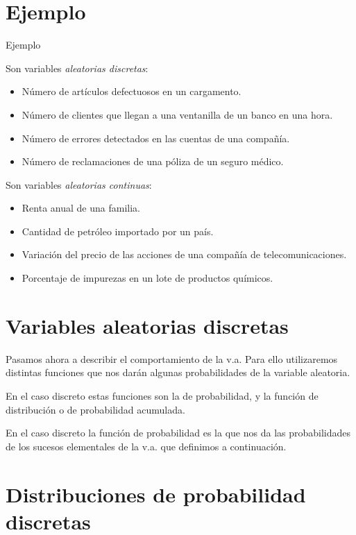 \documentclass[
  letterpaper,
  DIV=11,
  numbers=noendperiod]{scrreprt}
\providecommand{\tightlist}{%
  \setlength{\itemsep}{0pt}\setlength{\parskip}{0pt}}\usepackage{longtable,booktabs,array}
\begin{document}
\section{Ejemplo}\label{ejemplo}

\begin{Ejemplo}{Ejemplo}{}

Son variables \emph{aleatorias discretas}:

\begin{itemize}
\tightlist
\item
  Número de artículos defectuosos en un cargamento.
\item
  Número de clientes que llegan a una ventanilla de un banco en una
  hora.
\item
  Número de errores detectados en las cuentas de una compañía.
\item
  Número de reclamaciones de una póliza de un seguro médico.
\end{itemize}

Son variables \emph{aleatorias continuas}:

\begin{itemize}
\tightlist
\item
  Renta anual de una familia.
\item
  Cantidad de petróleo importado por un país.
\item
  Variación del precio de las acciones de una compañía de
  telecomunicaciones.
\item
  Porcentaje de impurezas en un lote de productos químicos.
\end{itemize}

\end{Ejemplo}

\section{Variables aleatorias
discretas}\label{variables-aleatorias-discretas}

Pasamos ahora a describir el comportamiento de la v.a. Para ello
utilizaremos distintas funciones que nos darán algunas probabilidades de
la variable aleatoria.

En el caso discreto estas funciones son la de probabilidad, y la función
de distribución o de probabilidad acumulada.

En el caso discreto la función de probabilidad es la que nos da las
probabilidades de los sucesos elementales de la v.a. que definimos a
continuación.

\section{Distribuciones de probabilidad
discretas}\label{distribuciones-de-probabilidad-discretas}
\end{document}
